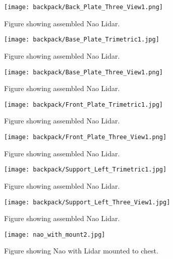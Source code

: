 \begin{figure}
\centering
\texttt{[image: backpack/Back\_Plate\_Three\_View1.png]}
\caption{Figure showing assembled Nao Lidar.}
\label{fig:nao_lidar_mount_backplate_three_view1}
\end{figure}

\begin{figure}
\centering
\texttt{[image: backpack/Base\_Plate\_Trimetric1.jpg]}
\caption{Figure showing assembled Nao Lidar.}
\label{fig:nao_lidar_mount_baseplate_trimetric1}
\end{figure}

\begin{figure}
\centering
\texttt{[image: backpack/Base\_Plate\_Three\_View1.png]}
\caption{Figure showing assembled Nao Lidar.}
\label{fig:nao_lidar_mount_baseplate_three_view1}
\end{figure}

\begin{figure}
\centering
\texttt{[image: backpack/Front\_Plate\_Trimetric1.jpg]}
\caption{Figure showing assembled Nao Lidar.}
\label{fig:nao_lidar_mount_frontplate_trimetric1}
\end{figure}

\begin{figure}
\centering
\texttt{[image: backpack/Front\_Plate\_Three\_View1.png]}
\caption{Figure showing assembled Nao Lidar.}
\label{fig:nao_lidar_mount_frontplate_three_view1}
\end{figure}

\begin{figure}
\centering
\texttt{[image: backpack/Support\_Left\_Trimetric1.jpg]}
\caption{Figure showing assembled Nao Lidar.}
\label{fig:nao_lidar_mount_supportleft_trimetric1}
\end{figure}

\begin{figure}
\centering
\texttt{[image: backpack/Support\_Left\_Three\_View1.jpg]}
\caption{Figure showing assembled Nao Lidar.}
\label{fig:nao_lidar_mount_supportleft_three_view1}
\end{figure}

\begin{figure}
\centering
\texttt{[image: nao\_with\_mount2.jpg]}
\caption{Figure showing Nao with Lidar mounted to chest.}
\label{fig:nao_lidar_mount1}
\end{figure}

